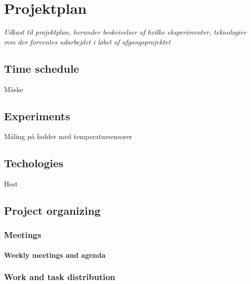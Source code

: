 \chapter{Projektplan}
\textit{Udkast til projektplan, herunder beskrivelser af hvilke eksperimenter, teknologier mm der forventes udarbejdet i løbet af afgangsprojektet}\\

\section{Time schedule}
Måske

\section{Experiments}
Måling på fødder med temperatursensorer

\section{Techologies}
Hest

\section{Project organizing}

\subsection{Meetings}

\subsubsection{Weekly meetings and agenda}

\subsection{Work and task distribution}
